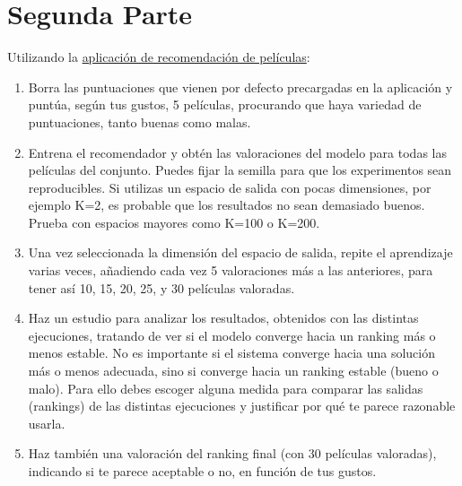 \documentclass{uimppracticas}
\begin{document}

\section*{Segunda Parte}

Utilizando la \href{https://poliformat.upv.es/access/content/group/ESP_0_2827/Movielens.zip}{aplicación de recomendación de películas}:

\begin{enumerate}
	\item Borra las puntuaciones que vienen por defecto precargadas en la aplicación y puntúa, según tus gustos, 5 películas, procurando que haya variedad de puntuaciones, tanto buenas como malas.
	
	\item 
	Entrena el recomendador y obtén las valoraciones del modelo para todas las películas del conjunto. Puedes fijar la semilla para que los experimentos sean reproducibles. Si utilizas un espacio de salida con pocas dimensiones, por ejemplo K=2, es probable que los resultados no sean demasiado buenos. Prueba con espacios mayores como K=100 o K=200.
	
	\item Una vez seleccionada la dimensión del espacio de salida, repite el aprendizaje varias veces, añadiendo  cada vez 5 valoraciones más a las anteriores, para tener así 10, 15, 20, 25, y 30 películas valoradas. 
	
	\item Haz un estudio para analizar los resultados, obtenidos con las distintas ejecuciones, tratando de ver si el modelo converge hacia un ranking más o menos estable. No es importante si el sistema converge hacia una solución más o menos adecuada, sino si converge hacia un ranking estable (bueno o malo). Para ello debes escoger alguna medida para comparar las salidas (rankings) de las distintas ejecuciones y justificar por qué te parece razonable usarla.
	
	\item Haz también una valoración del ranking final (con 30 películas valoradas), indicando si te parece aceptable o no, en función de tus gustos.
\end{enumerate}

%
%
\end{document}
